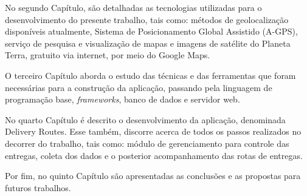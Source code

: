 No segundo Capítulo, são detalhadas as tecnologias utilizadas para o desenvolvimento do presente trabalho, tais como: métodos de geolocalização disponíveis atualmente, Sistema de Posicionamento Global Assistido (A-GPS), serviço de pesquisa e visualização de mapas e imagens de satélite do Planeta Terra, gratuito via internet, por meio do Google Maps.

O terceiro Capítulo aborda o estudo das técnicas e das ferramentas que foram necessárias para a construção da aplicação, passando pela linguagem de programação base, \textit{frameworks}, banco de dados e servidor web.

No quarto Capítulo é descrito o desenvolvimento da aplicação, denominada Delivery Routes. Esse também, discorre acerca de todos os passos realizados no decorrer do trabalho, tais como: módulo de gerenciamento para controle das entregas, coleta dos dados e o posterior acompanhamento das rotas de entregas.

Por fim, no quinto Capítulo são apresentadas as conclusões e as propostas para futuros trabalhos.